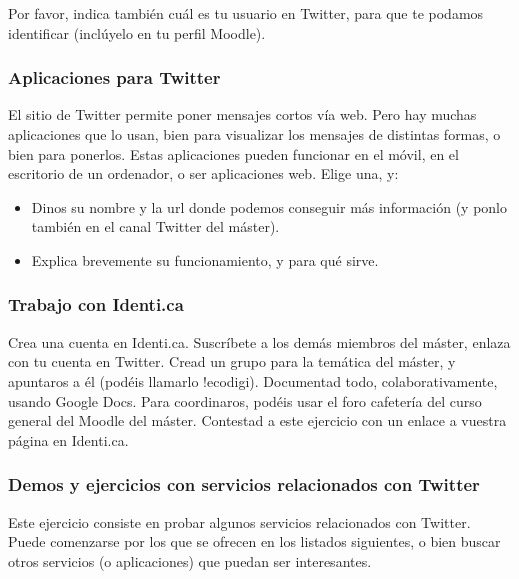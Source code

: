 \documentclass[a4paper,12pt]{article}
\begin{document}
Por favor, indica también cuál es tu usuario en Twitter, para que te podamos identificar (inclúyelo en tu perfil Moodle).

\subsubsection{Aplicaciones para Twitter}
\label{sub:apptwitter}

El sitio de Twitter permite poner mensajes cortos vía web. Pero hay muchas aplicaciones que lo usan, bien para visualizar los mensajes de distintas formas, o bien para ponerlos. Estas aplicaciones pueden funcionar en el móvil, en el escritorio de un ordenador, o ser aplicaciones web. Elige una, y:

\begin{itemize}
\item Dinos su nombre y la url donde podemos conseguir más información (y ponlo también en el canal Twitter del máster).
\item Explica brevemente su funcionamiento, y para qué sirve.
\end{itemize}

\subsubsection{Trabajo con Identi.ca}
\label{sub:identica}

Crea una cuenta en Identi.ca. Suscríbete a los demás miembros del máster, enlaza con tu cuenta en Twitter. Cread un grupo para la temática del máster, y apuntaros a él (podéis llamarlo !ecodigi). Documentad todo, colaborativamente, usando Google Docs. Para coordinaros, podéis usar el foro cafetería del curso general del Moodle del máster. Contestad a este ejercicio con un enlace a vuestra página en Identi.ca.

\subsubsection{Demos y ejercicios con servicios relacionados con Twitter}
\label{sub:twitter-relacion}

Este ejercicio consiste en probar algunos servicios relacionados con Twitter. Puede comenzarse por los que se ofrecen en los listados siguientes, o bien buscar otros servicios (o aplicaciones) que puedan ser interesantes.
\end{document}
